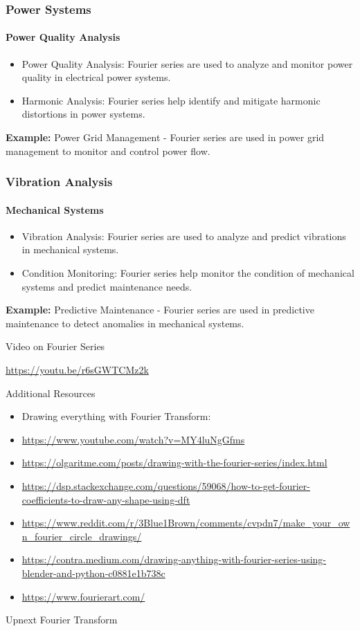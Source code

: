 \documentclass[aspectratio=169,xcolor=dvipsnames,svgnames,x11names,fleqn]{beamer}
\begin{document}
\begin{frame}
  \frametitle{Power Systems}
  \framesubtitle{Power Quality Analysis}
  \begin{itemize}
    \item Power Quality Analysis: Fourier series are used to analyze and monitor power quality in electrical power systems.
    \item Harmonic Analysis: Fourier series help identify and mitigate harmonic distortions in power systems.
  \end{itemize}
  \vspace{1cm}
  \textbf{Example:} Power Grid Management - Fourier series are used in power grid management to monitor and control power flow.
\end{frame}

\begin{frame}
  \frametitle{Vibration Analysis}
  \framesubtitle{Mechanical Systems}
  \begin{itemize}
    \item Vibration Analysis: Fourier series are used to analyze and predict vibrations in mechanical systems.
    \item Condition Monitoring: Fourier series help monitor the condition of mechanical systems and predict maintenance needs.
  \end{itemize}
  \vspace{1cm}
  \textbf{Example:} Predictive Maintenance - Fourier series are used in predictive maintenance to detect anomalies in mechanical systems.
\end{frame}

\begin{frame}{Video on Fourier Series}
    \LARGE 

    \begin{center}
        \url{https://youtu.be/r6sGWTCMz2k}
    \end{center}
\end{frame}

\begin{frame}{Additional Resources}
    \begin{itemize}
        \item Drawing everything with Fourier Transform:
\item \url{https://www.youtube.com/watch?v=MY4luNgGfms}
\item 
\url{https://olgaritme.com/posts/drawing-with-the-fourier-series/index.html}
\item \url{https://dsp.stackexchange.com/questions/59068/how-to-get-fourier-coefficients-to-draw-any-shape-using-dft}
\item \url{https://www.reddit.com/r/3Blue1Brown/comments/cvpdn7/make_your_own_fourier_circle_drawings/}
\item \url{https://contra.medium.com/drawing-anything-with-fourier-series-using-blender-and-python-c0881e1b738c}
\item \url{https://www.fourierart.com/}

    \end{itemize}
\end{frame}


\begin{frame}{Upnext}
    Fourier Transform
\end{frame}
\end{document}
